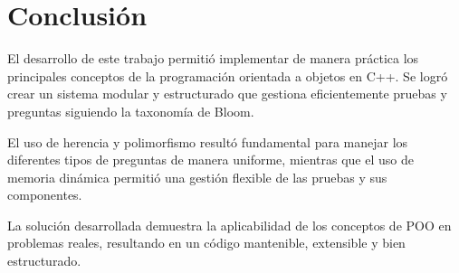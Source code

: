 \documentclass[12pt]{article}
\begin{document}
\section{Conclusión}
El desarrollo de este trabajo permitió implementar de manera práctica los principales conceptos de la programación orientada a objetos en C++. Se logró crear un sistema modular y estructurado que gestiona eficientemente pruebas y preguntas siguiendo la taxonomía de Bloom.

El uso de herencia y polimorfismo resultó fundamental para manejar los diferentes tipos de preguntas de manera uniforme, mientras que el uso de memoria dinámica permitió una gestión flexible de las pruebas y sus componentes.

La solución desarrollada demuestra la aplicabilidad de los conceptos de POO en problemas reales, resultando en un código mantenible, extensible y bien estructurado.
\end{document}
